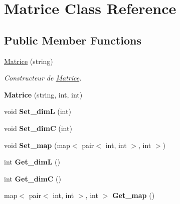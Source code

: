 \hypertarget{class_matrice}{\section{Matrice Class Reference}
\label{class_matrice}
}
\subsection*{Public Member Functions}
\begin{DoxyCompactItemize}
\item 
\hyperlink{class_matrice_a2960355d096a3415ca1e49cbf26a211b}{Matrice} (string)
\begin{DoxyCompactList}\small\item\em Constructeur de \hyperlink{class_matrice}{Matrice}. \end{DoxyCompactList}\item 
\hypertarget{class_matrice_a5e67677bc4ec3e776030920a140b5e45}{{\bfseries Matrice} (string, int, int)}\label{class_matrice_a5e67677bc4ec3e776030920a140b5e45}

\item 
\hypertarget{class_matrice_adf18304a72b2e828d99bfe4e1d0ce748}{void {\bfseries Set\-\_\-dim\-L} (int)}\label{class_matrice_adf18304a72b2e828d99bfe4e1d0ce748}

\item 
\hypertarget{class_matrice_a69305eca1fab66d359d683bd036aa4dc}{void {\bfseries Set\-\_\-dim\-C} (int)}\label{class_matrice_a69305eca1fab66d359d683bd036aa4dc}

\item 
\hypertarget{class_matrice_a752aaa50023c03f41ac68c795b2ae211}{void {\bfseries Set\-\_\-map} (map$<$ pair$<$ int, int $>$, int $>$)}\label{class_matrice_a752aaa50023c03f41ac68c795b2ae211}

\item 
\hypertarget{class_matrice_ae312a978bd106c90dfd2216ebfd031df}{int {\bfseries Get\-\_\-dim\-L} ()}\label{class_matrice_ae312a978bd106c90dfd2216ebfd031df}

\item 
\hypertarget{class_matrice_ab92e39a9889650bc141fa0abe44fce23}{int {\bfseries Get\-\_\-dim\-C} ()}\label{class_matrice_ab92e39a9889650bc141fa0abe44fce23}

\item 
\hypertarget{class_matrice_ad64fd72e30249645f9edf19eaaeb3eac}{map$<$ pair$<$ int, int $>$, int $>$ {\bfseries Get\-\_\-map} ()}\label{class_matrice_ad64fd72e30249645f9edf19eaaeb3eac}


\end{DoxyCompactItemize}
